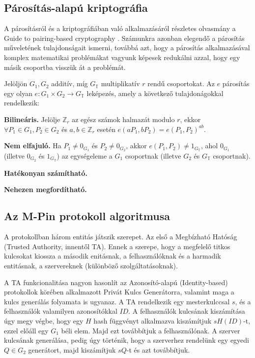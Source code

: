 \subsection{Párosítás-alapú kriptográfia}

A párosításról és a kriptográfiában való alkalmazásáról részletes olvasmány a Guide to pairing-based cryptography \cite{PBCGuide}. Számunkra azonban elegendő a párosítás műveletének tulajdonságait ismerni, továbbá azt, hogy a párosítás alkalmazásával komplex matematikai problémákat vagyunk képesek redukálni azzal, hogy egy másik csoportba visszük át a problémát.

Jelöljön $G_1, G_2$ additív, míg $G_\mathbb{T}$ multiplikatív $r$ rendű csoportokat. Az $e$ párosítás egy olyan $e : G_1 \times G_2 \rightarrow G_\mathbb{T}$ leképezés, amely a következő tulajdonágokkal rendelkezik:
\begin{outdentlist}
    \item[] \textbf{Bilineáris.} Jelölje $\mathbb{Z}_r$ az egész számok halmazát modulo $r$, ekkor $\forall P_1 \in G_1, P_2 \in G_2$ és $a, b \in \mathbb{Z}_r$ esetén $e(aP_1, bP_2) = e(P_1, P_2)^{ab}$.

    \item[] \textbf{Nem elfajuló.} Ha $P_1 \neq 0_{G_1}$ és $P_2 \neq 0_{G_2}$, akkor $e(P_1, P_2) \neq 1_{G_\mathbb{T}}$, ahol $0_{G_1}$ (illetve $0_{G_2}$ és $1_{G_\mathbb{T}}$) az egységeleme a $G_1$ csoportnak (illetve $G_2$ és $G_\mathbb{T}$ csoportnak).

    \item[] \textbf{Hatékonyan számítható.}

    \item[] \textbf{Nehezen megfordítható.}
\end{outdentlist}

\subsection{Az M-Pin protokoll algoritmusa}

A protokollban három entitás játszik szerepet. Az első a Megbízható Hatóság (Trusted Authority, innentől TA). Ennek a szerepe, hogy a megfelelő titkos kulcsokat kiossza a második enitásnak, a felhasználóknak és a harmadik entitásnak, a szervereknek (különböző szolgáltatásoknak). 

A TA funkcionalitása nagyon hasonlít az Azonosító-alapú (Identity-based) protokollok körében alkalmazott Privát Kulcs Generátorra, valamint maga a kulcs generálás folyamata is ugyanaz. A TA rendelkezik egy mesterkulccsal $s$, és a felhasználók valamilyen azonosítókkal $ID$. A felhasználók kulcsának kiszámítása úgy megy végbe, hogy egy $H$ hash függvényt alkalmazva kiszámítjuk $sH(ID)$-t, ezzel előáll egy $G_1$ béli elem. Majd ezt továbbítjuk a felhasználónak. A szerver kulcsának generálása, pedig úgy történik, hogy a szerverhez rendelünk egy egyedi $Q \in G_2$ generátort, majd kiszámítjuk $sQ$-t és azt továbbítjuk.

